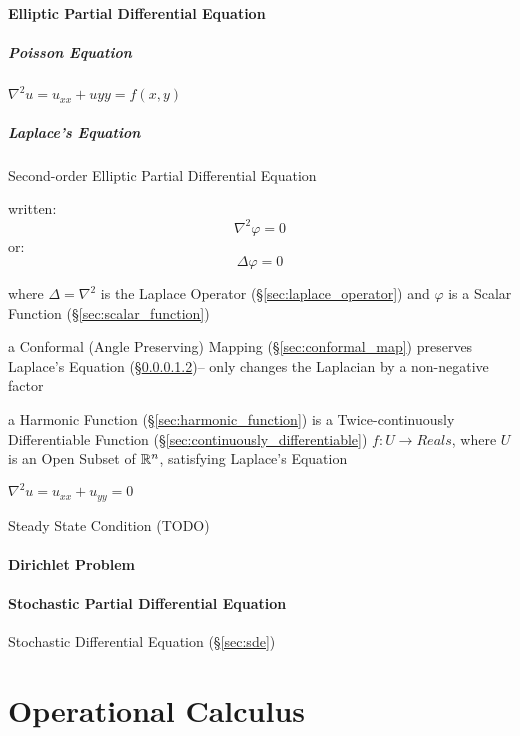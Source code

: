 \paragraph{Elliptic Partial Differential Equation}
\label{sec:elliptic_partial_differential}\hfill

\subparagraph{Poisson Equation}\label{sec:poisson_equation}\hfill

$\nabla^2 u = u_{xx} + u{yy} = f(x,y)$



\subparagraph{Laplace's Equation}\label{sec:laplaces_equation}\hfill

Second-order Elliptic Partial Differential Equation

written:
\[ \nabla^2 \varphi = 0 \]
or:
\[ \Delta \varphi = 0 \]

where $\Delta = \nabla^2$ is the Laplace Operator
(\S\ref{sec:laplace_operator}) and $\varphi$ is a Scalar Function
(\S\ref{sec:scalar_function})

a Conformal (Angle Preserving) Mapping (\S\ref{sec:conformal_map}) preserves
Laplace's Equation (\S\ref{sec:laplaces_equation})-- only changes the Laplacian
by a non-negative factor

a Harmonic Function (\S\ref{sec:harmonic_function}) is a Twice-continuously
Differentiable Function (\S\ref{sec:continuously_differentiable}) $f : U
\rightarrow Reals$, where $U$ is an Open Subset of $\mathbb{R}^n$, satisfying
Laplace's Equation

$\nabla^2 u = u_{xx} + u_{yy} = 0$ %

Steady State Condition (TODO)



\paragraph{Dirichlet Problem}\label{sec:dirichlet_problem}\hfill

\paragraph{Stochastic Partial Differential Equation}\label{sec:spde}\hfill

\fist Stochastic Differential Equation (\S\ref{sec:sde})



\section{Operational Calculus}\label{sec:operational_calculus}

